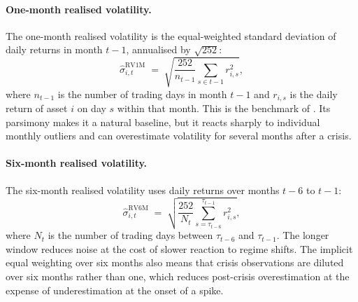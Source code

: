\documentclass[12pt, a4paper]{article}
\newcommand{\shat}{\hat{\sigma}}
\begin{document}
\paragraph{One-month realised volatility.}
The one-month realised volatility is the equal-weighted standard deviation of daily returns
in month $t-1$, annualised by $\sqrt{252}$:
\begin{equation}
  \shat^{\mathrm{RV1M}}_{i,t} \;=\;
  \sqrt{\frac{252}{n_{t-1}} \sum_{s \in t-1} r_{i,s}^2 },
\end{equation}
where $n_{t-1}$ is the number of trading days in month $t-1$ and $r_{i,s}$ is the daily
return of asset $i$ on day $s$ within that month. This is the benchmark of
\citet{Moreira2017}. Its parsimony makes it a natural baseline, but it reacts sharply to
individual monthly outliers and can overestimate volatility for several months after a
crisis.

\paragraph{Six-month realised volatility.}
The six-month realised volatility uses daily returns over months $t-6$ to $t-1$:
\begin{equation}
  \shat^{\mathrm{RV6M}}_{i,t} \;=\;
  \sqrt{ \frac{252}{N_t} \sum_{s=\tau_{t-6}}^{\tau_{t-1}} r_{i,s}^2 },
\end{equation}
where $N_t$ is the number of trading days between $\tau_{t-6}$ and $\tau_{t-1}$. The
longer window reduces noise at the cost of slower reaction to regime shifts. The implicit
equal weighting over six months also means that crisis observations are diluted over six
months rather than one, which reduces post-crisis overestimation at the expense of
underestimation at the onset of a spike.
\end{document}
